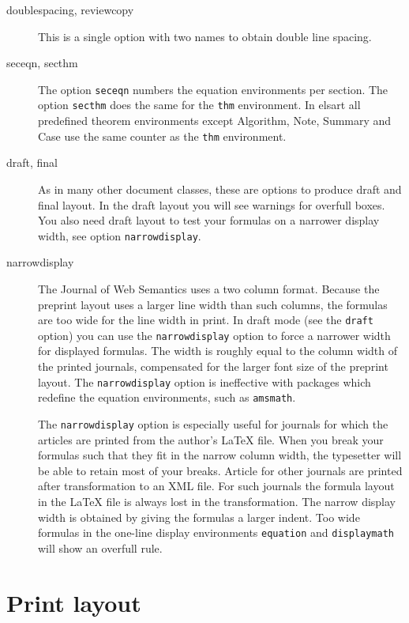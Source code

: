 \documentclass{elsart3p}    %
\begin{document}
\begin{description}
  
\item[doublespacing, reviewcopy] This is a single option with two
  names to obtain double line spacing.
  
\item[seceqn, secthm] The option \texttt{seceqn} numbers the
  equation environments per section. The option \texttt{secthm}
  does the same for the \texttt{thm} environment. In elsart all
  predefined theorem environments except Algorithm, Note, Summary
  and Case use the same counter as the \texttt{thm} environment.

\item[draft, final] As in many other document classes, these are
  options to produce draft and final layout. In the draft layout
  you will see warnings for overfull boxes. You also need draft
  layout to test your formulas on a narrower display width, see
  option \texttt{narrowdisplay}.
  
\item[narrowdisplay] The Journal of Web Semantics uses a two
  column format. Because the preprint layout uses a larger line
  width than such columns, the formulas are too wide for the line
  width in print. In draft mode (see the \texttt{draft} option)
  you can use the \texttt{narrowdisplay} option to force a
  narrower width for displayed formulas. The width is roughly
  equal to the column width of the printed journals, compensated
  for the larger font size of the preprint layout. The
  \texttt{narrowdisplay} option is ineffective with packages
  which redefine the equation environments, such as
  \texttt{amsmath}.
  
  The \texttt{narrowdisplay} option is especially useful for
  journals for which the articles are printed from the author's
  \LaTeX{} file.  When you break your formulas such that they fit
  in the narrow column width, the typesetter will be able to
  retain most of your breaks. Article for other journals are
  printed after transformation to an XML file.  For such journals
  the formula layout in the \LaTeX{} file is always lost in the
  transformation. The narrow display width is obtained by giving the formulas a
  larger indent. Too wide formulas in the one-line display
  environments \texttt{equation} and \texttt{displaymath} will
  show an overfull rule.

\end{description}

\section{Print layout}
\label{printlayout}
\end{document}
